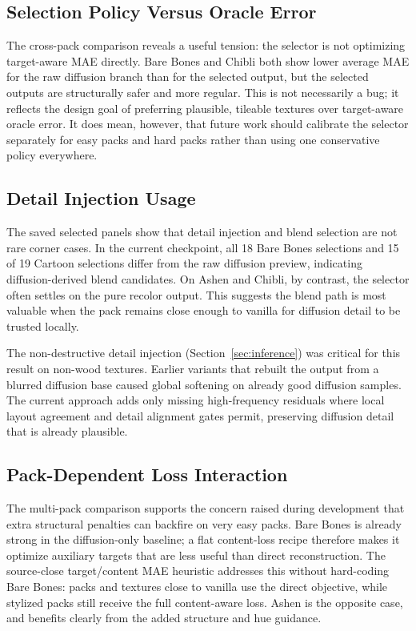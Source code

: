 \subsection{Selection Policy Versus Oracle Error}

The cross-pack comparison reveals a useful tension: the selector is not
optimizing target-aware MAE directly. Bare Bones and Chibli both show lower
average MAE for the raw diffusion branch than for the selected output, but the
selected outputs are structurally safer and more regular. This is not
necessarily a bug; it reflects the design goal of preferring plausible,
tileable textures over target-aware oracle error. It does mean, however, that
future work should calibrate the selector separately for easy packs and hard
packs rather than using one conservative policy everywhere.

\subsection{Detail Injection Usage}

The saved selected panels show that detail injection and blend selection are
not rare corner cases. In the current checkpoint, all 18 Bare Bones selections
and 15 of 19 Cartoon selections differ from the raw diffusion preview,
indicating diffusion-derived blend candidates. On Ashen and Chibli, by
contrast, the selector often settles on the pure recolor output. This suggests
the blend path is most valuable when the pack remains close enough to vanilla
for diffusion detail to be trusted locally.

The non-destructive detail injection (Section~\ref{sec:inference}) was
critical for this result on non-wood textures. Earlier variants that rebuilt
the output from a blurred diffusion base caused global softening on already
good diffusion samples. The current approach adds only missing high-frequency
residuals where local layout agreement and detail alignment gates permit,
preserving diffusion detail that is already plausible.

\subsection{Pack-Dependent Loss Interaction}

The multi-pack comparison supports the concern raised during development that
extra structural penalties can backfire on very easy packs. Bare Bones is
already strong in the diffusion-only baseline; a flat content-loss recipe
therefore makes it optimize auxiliary targets that are less useful than direct
reconstruction. The source-close target/content MAE heuristic addresses this
without hard-coding Bare Bones: packs and textures close to vanilla use the
direct objective, while stylized packs still receive the full content-aware
loss. Ashen is the opposite case, and benefits clearly from the added structure
and hue guidance.

